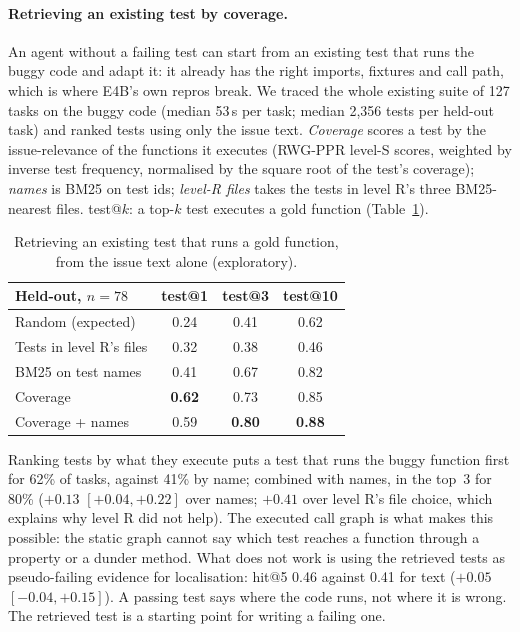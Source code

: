 \documentclass[10pt]{article}
\begin{document}
\paragraph{Retrieving an existing test by coverage.} An agent without a failing test can start from an existing test
that runs the buggy code and adapt it: it already has the right imports, fixtures and call path, which is where E4B's
own repros break. We traced the whole existing suite of 127 tasks on the buggy code (median 53\,s per task; median
2{,}356 tests per held-out task) and ranked tests using only the issue text. \emph{Coverage} scores a test by the
issue-relevance of the functions it executes (RWG-PPR level-S scores, weighted by inverse test frequency, normalised by
the square root of the test's coverage); \emph{names} is BM25 on test ids; \emph{level-R files} takes the tests in level
R's three BM25-nearest files. test@$k$: a top-$k$ test executes a gold function (Table~\ref{tab:e1b}).

\begin{table}[h]
\centering\small
\begin{tabular}{lccc}
\toprule
Held-out, $n=78$ & test@1 & test@3 & test@10 \\
\midrule
Random (expected) & 0.24 & 0.41 & 0.62 \\
Tests in level R's files & 0.32 & 0.38 & 0.46 \\
BM25 on test names & 0.41 & 0.67 & 0.82 \\
Coverage & \textbf{0.62} & 0.73 & 0.85 \\
Coverage + names & 0.59 & \textbf{0.80} & \textbf{0.88} \\
\bottomrule
\end{tabular}
\caption{Retrieving an existing test that runs a gold function, from the issue text alone (exploratory).}
\label{tab:e1b}
\end{table}

Ranking tests by what they execute puts a test that runs the buggy function first for 62\% of tasks, against 41\% by
name; combined with names, in the top~3 for 80\% ($+0.13$ $[+0.04, +0.22]$ over names; $+0.41$ over level R's file
choice, which explains why level R did not help). The executed call graph is what makes this possible: the static graph
cannot say which test reaches a function through a property or a dunder method. What does not work is using the
retrieved tests as pseudo-failing evidence for localisation: hit@5 0.46 against 0.41 for text ($+0.05$
$[-0.04, +0.15]$). A passing test says where the code runs, not where it is wrong. The retrieved test is a starting point
for writing a failing one.
\end{document}
